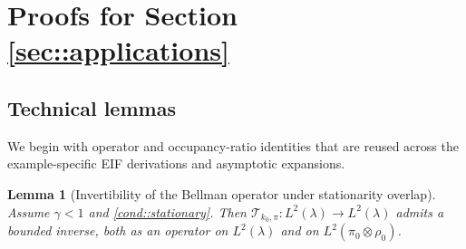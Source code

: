 \documentclass[11pt]{article}
\theoremstyle{plain}
\newtheorem{lemma}[theorem]{Lemma}
\begin{document}
 

\section{Proofs for Section \ref{sec::applications}}
 
\label{appendix::applications}
\subsection{Technical lemmas}

We begin with operator and occupancy-ratio identities that are reused across the
example-specific EIF derivations and asymptotic expansions.



 
 
 
\begin{lemma}[Invertibility of the Bellman operator under stationarity overlap]
\label{lemma::invertibility}
Assume $\gamma < 1$ and \ref{cond::stationary}. Then $\mathcal{T}_{k_0,\pi}:L^2(\lambda) \to L^2(\lambda)$ admits a bounded inverse, both as an operator on $L^2(\lambda)$ and on $L^2(\pi_0 \otimes \rho_0)$.
\end{lemma}
\end{document}
